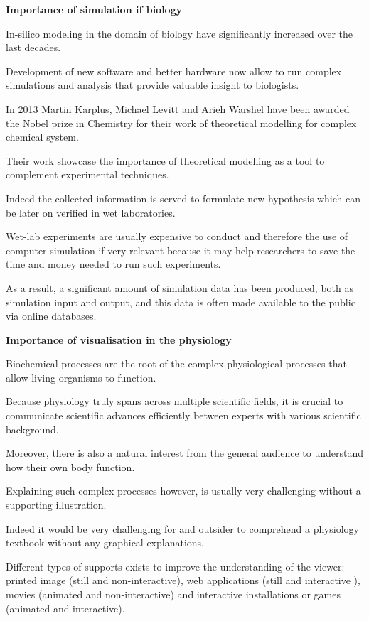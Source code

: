 \textbf{Importance of simulation if biology}

In-silico modeling in the domain of biology have significantly increased over the last decades.

Development of new software and better hardware now allow to run complex simulations and analysis that provide valuable insight to biologists.

In 2013 Martin Karplus, Michael Levitt and Arieh Warshel have been awarded the Nobel prize in Chemistry for their work of theoretical modelling for complex chemical system.

Their work showcase the importance of theoretical modelling as a tool to complement experimental techniques.

Indeed the collected information is served to formulate new hypothesis which can be later on verified in wet laboratories.

Wet-lab experiments are usually expensive to conduct and therefore the use of computer simulation if very relevant because it may help researchers to save the time and money needed to run such experiments.

As a result, a significant amount of simulation data has been produced, both as simulation input and output, and this data is often made available to the public via online databases.


\textbf{Importance of visualisation in the physiology}

Biochemical processes are the root of the complex physiological processes that allow living organisms to function.

Because physiology truly spans across multiple scientific fields, it is crucial to communicate scientific advances efficiently between experts with various scientific background.

Moreover, there is also a natural interest from the general audience to understand how their own body function.

Explaining such complex processes however, is usually very challenging without a supporting illustration.

Indeed it would be very challenging for and outsider to comprehend a physiology textbook without any graphical explanations.

Different types of supports exists to improve the understanding of the viewer: printed image (still and non-interactive), web applications (still and interactive ), movies (animated and non-interactive) and interactive installations or games (animated and interactive).

